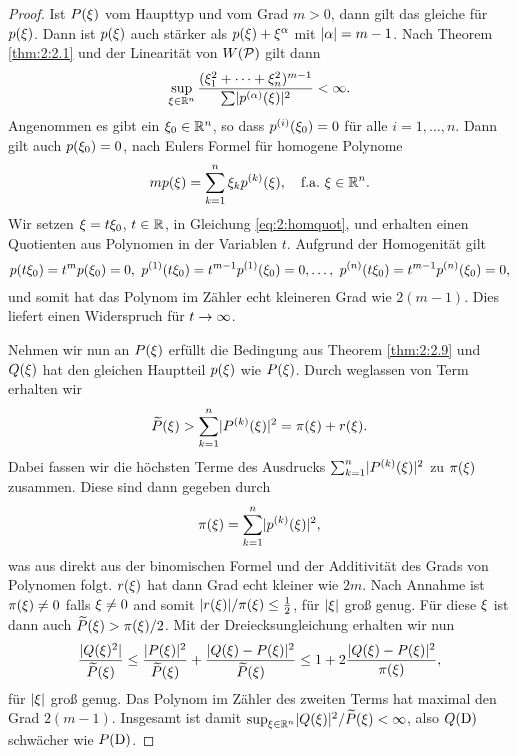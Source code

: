 \begin{proof}
Ist $P(\xi)$ vom Haupttyp und vom Grad $m>0$,
dann gilt das gleiche für $p(\xi)$.
Dann ist $p(\xi)$ auch stärker als $p(\xi)+\xi^\alpha$
mit $\lvert\alpha\rvert=m-1$.
Nach Theorem \ref{thm:2:2.1} und der Linearität von $W(\mathcal P)$
gilt dann
\begin{equation}\label{eq:2:homquot}
\sup_{\xi\in\mathbb R^n}\frac{(\xi^2_1+\dots+\xi^2_n)^{m-1}}{\sum\lvert p^{(\alpha)}(\xi)\rvert^2}<\infty.
\end{equation}
Angenommen es gibt ein $\xi_0\in\mathbb R^n$,
so dass $p^{(i)}(\xi_0)=0$ für alle $i=1,\dots,n$.
Dann gilt auch $p(\xi_0)=0$,
nach Eulers Formel für homogene Polynome
\begin{equation}
mp(\xi)=\sum_{k=1}^n\xi_kp^{(k)}(\xi),\quad\text{f.a.}~\xi\in\mathbb R^n.
\end{equation}
Wir setzen $\xi=t\xi_0$, $t\in\mathbb R$, in Gleichung \eqref{eq:2:homquot},
und erhalten einen Quotienten aus Polynomen in der Variablen $t$.
Aufgrund der Homogenität gilt
\begin{equation}
p(t\xi_0)=t^mp(\xi_0)=0,~p^{(1)}(t\xi_0)=t^{m-1}p^{(1)}(\xi_0)=0,
\dots,~p^{(n)}(t\xi_0)=t^{m-1}p^{(n)}(\xi_0)=0,
\end{equation}
und somit hat das Polynom im Zähler echt kleineren Grad wie $2(m-1)$.
Dies liefert einen Widerspruch für $t\to\infty$.

Nehmen wir nun an $P(\xi)$ erfüllt die Bedingung aus Theorem \ref{thm:2:2.9}
und $Q(\xi)$ hat den gleichen Hauptteil $p(\xi)$ wie $P(\xi)$.
Durch weglassen von Term erhalten wir
\begin{equation}
\widetilde{P}(\xi)>\sum_{k=1}^n\lvert P^{(k)}(\xi)\rvert^2=\pi(\xi)+r(\xi).
\end{equation}
Dabei fassen wir die höchsten Terme des Ausdrucks
$\sum_{k=1}^n\lvert P^{(k)}(\xi)\rvert^2$ zu $\pi(\xi)$ zusammen.
Diese sind dann gegeben durch
\begin{equation}
\pi(\xi)=\sum_{k=1}^n\lvert p^{(k)}(\xi)\rvert^2,
\end{equation}
was aus direkt aus der binomischen Formel
und der Additivität des Grads von Polynomen folgt.
$r(\xi)$ hat dann Grad echt kleiner wie $2m$.
Nach Annahme ist $\pi(\xi)\neq0$ falls $\xi\neq0$
and somit $\lvert r(\xi)\rvert/\pi(\xi)\leq\tfrac12$,
für $\lvert\xi\rvert$ groß genug.
Für diese $\xi$ ist dann auch $\widetilde{P}(\xi)>\pi(\xi)/2$.
Mit der Dreiecksungleichung erhalten wir nun
\begin{equation}
\frac{\lvert Q(\xi)^2\rvert}{\widetilde{P}(\xi)}
\leq\frac{\lvert P(\xi)\rvert^2}{\widetilde{P}(\xi)}+\frac{\lvert Q(\xi)-P(\xi)\rvert^2}{\widetilde{P}(\xi)}
\leq1+2\frac{\lvert Q(\xi)-P(\xi)\rvert^2}{\pi(\xi)},
\end{equation}
für $\lvert\xi\rvert$ groß genug.
Das Polynom im Zähler des zweiten Terms hat maximal den Grad $2(m-1)$.
Insgesamt ist damit $\sup_{\xi\in\mathbb R^n}\lvert Q(\xi)\rvert^2/\widetilde{P}(\xi)<\infty$,
also $Q(\mathrm D)$ schwächer wie $P(\mathrm D)$.
\end{proof}

